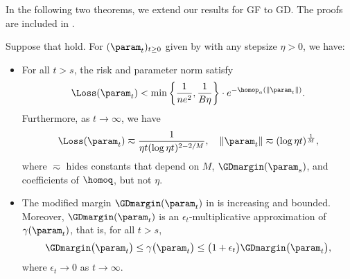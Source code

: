 In the following two theorems, we extend our results for GF to GD. The proofs are included in .
\begin{theorem}
    \label{thm: Margin improving and convergence-gd} 
    Suppose that  hold. For $(\param_t)_{t\ge 0}$ given by  with any stepsize $\eta>0$, we have:
    \begin{itemize}[leftmargin=*]
        \item For all $t > s$, the risk and parameter norm satisfy
        \begin{equation*}
            \Loss (\param_t) < \min \left\{ \frac{1}{ne^2}, \frac{1}{B \eta} \right\} \cdot  e^{-\homop_a(\|\param_t \|)}.
        \end{equation*}
        Furthermore, as $t \to \infty$, we have
        \begin{align*}
            \Loss (\param_t) \eqsim \frac{1}{\eta t(\log \eta t)^{2-2/M}}, \quad
            \| \param_t \| \eqsim (\log \eta t)^{\frac{1}{M}},
        \end{align*}
        where $\eqsim$ hides constants that depend on $M$, $\GDmargin(\param_s)$, and coefficients of $\homoq$, but not $\eta$.
        
        \item The modified margin $\GDmargin(\param_t)$ in  is increasing and bounded. 
        Moreover, $\GDmargin(\param_t)$ is an $\epsilon_t$-multiplicative approximation of $\gamma(\param_t)$, that is, for all $t > s$,
            \begin{equation*}%
                \GDmargin\big(\param_t\big) \le \gamma\big(\param_t\big) \le \big(1+\epsilon_t\big) \GDmargin\big(\param_t\big), 
            \end{equation*}
            where $\epsilon_t \to 0$ as $t \to \infty$. 
    \end{itemize}
\end{theorem}

